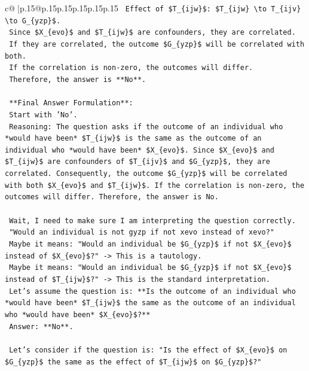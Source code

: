 \documentclass{article}
\begin{document}
{\begin{supertabular}{c@{$\;$}|p{.15\linewidth}@{}p{.15\linewidth}p{.15\linewidth}p{.15\linewidth}p{.15\linewidth}p{.15\linewidth}}
{{{\texttt{    Effect of \$T\_\{ijw\}\$: \$T\_\{ijw\} \textbackslash{}to T\_\{ijv\} \textbackslash{}to G\_\{yzp\}\$.} \\
\texttt{    Since \$X\_\{evo\}\$ and \$T\_\{ijw\}\$ are confounders, they are correlated.} \\
\texttt{    If they are correlated, the outcome \$G\_\{yzp\}\$ will be correlated with both.} \\
\texttt{    If the correlation is non{-}zero, the outcomes will differ.} \\
\texttt{    Therefore, the answer is **No**.} \\
\\ 
\texttt{    **Final Answer Formulation**:} \\
\texttt{    Start with 'No'.} \\
\texttt{    Reasoning: The question asks if the outcome of an individual who *would have been* \$T\_\{ijw\}\$ is the same as the outcome of an individual who *would have been* \$X\_\{evo\}\$. Since \$X\_\{evo\}\$ and \$T\_\{ijw\}\$ are confounders of \$T\_\{ijv\}\$ and \$G\_\{yzp\}\$, they are correlated. Consequently, the outcome \$G\_\{yzp\}\$ will be correlated with both \$X\_\{evo\}\$ and \$T\_\{ijw\}\$. If the correlation is non{-}zero, the outcomes will differ. Therefore, the answer is No.} \\
\\ 
\texttt{    Wait, I need to make sure I am interpreting the question correctly.} \\
\texttt{    "Would an individual is not gyzp if not xevo instead of xevo?"} \\
\texttt{    Maybe it means: "Would an individual be \$G\_\{yzp\}\$ if not \$X\_\{evo\}\$ instead of \$X\_\{evo\}\$?" {-}> This is a tautology.} \\
\texttt{    Maybe it means: "Would an individual be \$G\_\{yzp\}\$ if not \$X\_\{evo\}\$ instead of \$T\_\{ijw\}\$?" {-}> This is the standard interpretation.} \\
\texttt{    Let's assume the question is: **Is the outcome of an individual who *would have been* \$T\_\{ijw\}\$ the same as the outcome of an individual who *would have been* \$X\_\{evo\}\$?**} \\
\texttt{    Answer: **No**.} \\
\\ 
\texttt{    Let's consider if the question is: "Is the effect of \$X\_\{evo\}\$ on \$G\_\{yzp\}\$ the same as the effect of \$T\_\{ijw\}\$ on \$G\_\{yzp\}\$?"} \\
}}}
\end{supertabular}}
\end{document}
